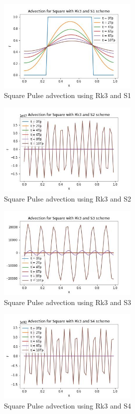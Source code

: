 \documentclass{article}
\begin{document}
	\begin{figure}[H]
		\centering
		\includegraphics[width=0.6\textwidth]{ad5.jpg}
		\caption{\label{} Square Pulse advection using Rk3 and S1}
	\end{figure}
	\begin{figure}[H]
		\centering
		\includegraphics[width=0.6\textwidth]{ad6.jpg}
		\caption{\label{} Square Pulse advection using Rk3 and S2}
	\end{figure}
	\begin{figure}[H]
		\centering
		\includegraphics[width=0.6\textwidth]{ad7.jpg}
		\caption{\label{} Square Pulse advection using Rk3 and S3}
	\end{figure}
	\begin{figure}[H]
		\centering
		\includegraphics[width=0.6\textwidth]{ad8.jpg}
		\caption{\label{} Square Pulse advection using Rk3 and S4}
	\end{figure}
	
\end{document}
